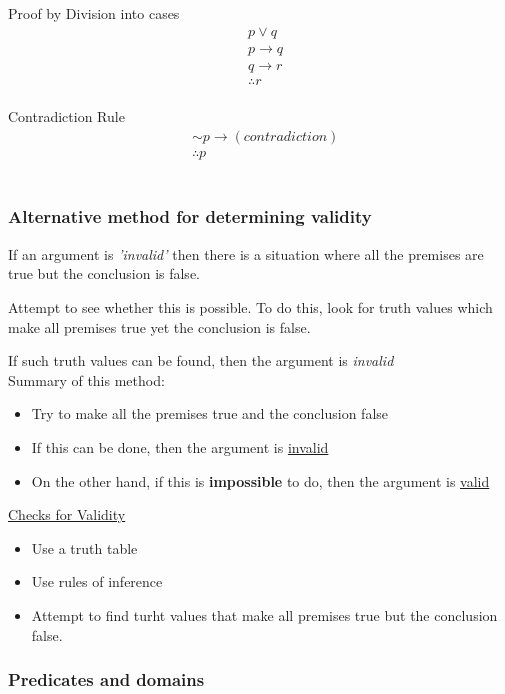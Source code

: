 \documentclass{article}
\begin{document}
Proof by Division into cases
\begin{align*}
& p \lor q \\ 
& p \rightarrow q \\
& q \rightarrow r \\
& \therefore r
\end{align*} \\

Contradiction Rule
\begin{align*}
& \sim p \rightarrow (contradiction) \\
& \therefore p
\end{align*} \\

\subsubsection{Alternative method for determining validity}

If an argument is \textit{'invalid'} then there is a situation where all the premises are true but the conclusion is false.

Attempt to see whether this is possible. To do this, look for truth values which make all premises true yet the conclusion is false.

If such truth values can be found, then the argument is \textit{invalid} \\

Summary of this method:
\begin{itemize}
\item Try to make all the premises true and the conclusion false
\item If this can be done, then the argument is \underline{invalid}
\item On the other hand, if this is \textbf{impossible} to do, then the argument is \underline{valid}
\end{itemize}

\underline{Checks for Validity}
\begin{itemize}
\item Use a truth table
\item Use rules of inference
\item Attempt to find turht values that make all premises true but the conclusion false.
\end{itemize}

\subsubsection{Predicates and domains}
\end{document}
